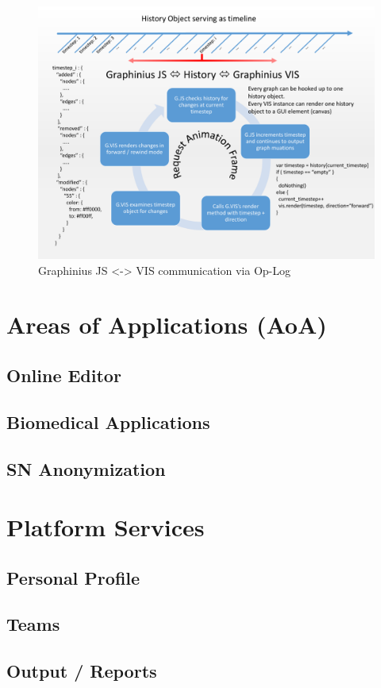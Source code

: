 \begin{landscape}
\begin{figure}[ht]
	\label{fig_history_workflow}
	\centering
	\vspace{-2.0cm}
	\includegraphics[width=1.6\textwidth]{figures/History_Workflow_pdf}
	\caption{Graphinius JS <-> VIS communication via Op-Log}
\end{figure}
\end{landscape}


\section{Areas of Applications (AoA)}
\label{sect:areas_of_applications}

	\subsection{Online Editor}
	\label{ssect:aoa_editor}
	
	\subsection{Biomedical Applications}
	\label{ssect:aoa_bioapps}
	
	\subsection{SN Anonymization}
	\label{ssect:aoa_anonym}


\section{Platform Services}
\label{sect:platform_services}

	\subsection{Personal Profile}
	\label{ssect:service_profile}
	
	\subsection{Teams}
	\label{ssect:service_teams}
	
	\subsection{Output / Reports}
	\label{ssect:service_output}
